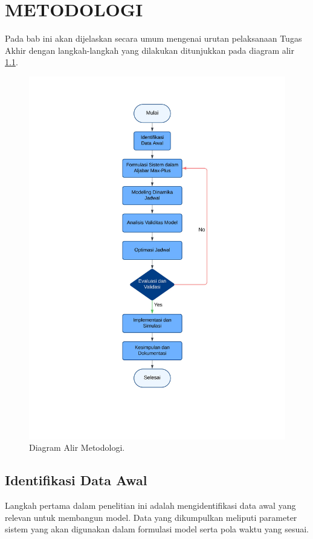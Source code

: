 \documentclass{file/TA-ITS}
\theoremstyle{definition}
\theoremstyle{definition}
\theoremstyle{plain}
\begin{document}
\chapter{METODOLOGI}
Pada bab ini akan dijelaskan secara umum mengenai urutan pelaksanaan Tugas Akhir dengan langkah-langkah yang dilakukan ditunjukkan pada diagram alir \ref{diagramalir}.
\begin{figure}[H]
	\centering
	\includegraphics[trim={0 2cm 0 2cm},clip,scale=0.7]{foto/Diagram alir max plus.jpg}
	\caption{Diagram Alir Metodologi.}
	\label{diagramalir}
\end{figure}

\section{Identifikasi Data Awal}
Langkah pertama dalam penelitian ini adalah mengidentifikasi data awal yang relevan untuk membangun model. Data yang dikumpulkan meliputi parameter sistem yang akan digunakan dalam formulasi model serta pola waktu yang sesuai.
\end{document}
